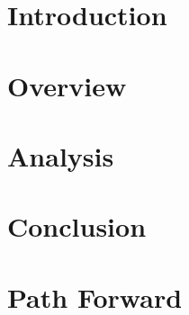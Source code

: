 
\chapter{Introduction}
\label{sec:Introduction}

\chapter{Overview}
\label{sec:Overview}

\chapter{Analysis}
\label{sec:Analysis}

\chapter{Conclusion}
\label{sec:Conclusion}

\chapter{Path Forward}
\label{sec:PathForward}

